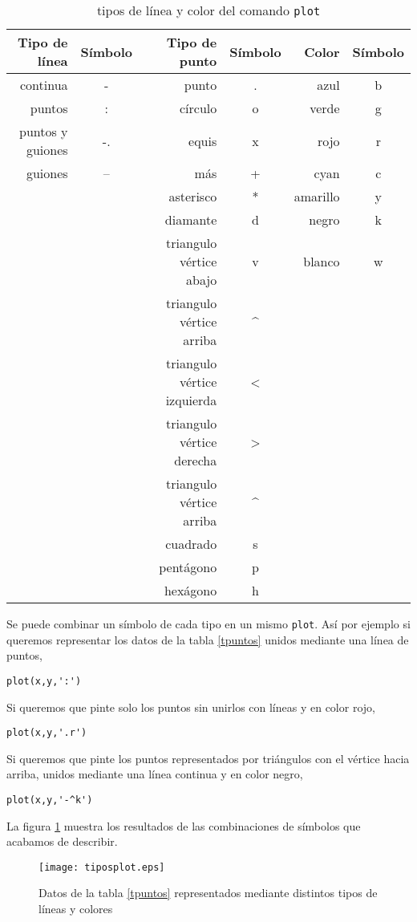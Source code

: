 \begin{table}[h]
\caption{tipos de línea y color del comando \texttt{plot}}
\centering
\begin{tabular}{rc|rc|rc}
Tipo de línea&Símbolo&Tipo de punto& Símbolo &Color&Símbolo\\ 
\hline
continua&-&punto&.&azul&b\\
puntos&:&círculo&o&verde&g\\
puntos y guiones&-.&equis&x&rojo&r\\
guiones&--&más&+&cyan&c\\
&&asterisco&*&amarillo&y\\
&&diamante&d&negro&k\\
&&triangulo vértice abajo&v&blanco&w\\
&&triangulo vértice arriba&\^{}&&\\
&&triangulo vértice izquierda&\textless&&\\
&&triangulo vértice derecha&\textgreater&&\\
&&triangulo vértice arriba&\^{}&&\\
&&cuadrado&s&&\\
&&pentágono&p&&\\
&&hexágono&h&\\
\hline
\end{tabular}
\label{tcolor}
\end{table} 

Se puede combinar un símbolo de cada tipo en un mismo \texttt{plot}. Así por ejemplo si queremos representar los datos de la tabla \ref{tpuntos} unidos mediante una línea de puntos,
\begin{verbatim}
plot(x,y,':')
\end{verbatim} 

Si queremos que pinte solo los puntos sin unirlos con líneas y en color rojo,
\begin{verbatim}
plot(x,y,'.r')
\end{verbatim}

Si queremos que pinte los puntos representados por triángulos con el vértice hacia arriba, unidos mediante una línea continua y en color negro,

\begin{verbatim}
plot(x,y,'-^k')
\end{verbatim}

La figura \ref{fig:tplot} muestra los resultados de las combinaciones de símbolos que acabamos de describir.

\begin{figure}[h]
\centering
\texttt{[image: tiposplot.eps]}
\caption{Datos de la tabla \ref{tpuntos} representados mediante distintos tipos de líneas y colores}
\label{fig:tplot}
\end{figure}

